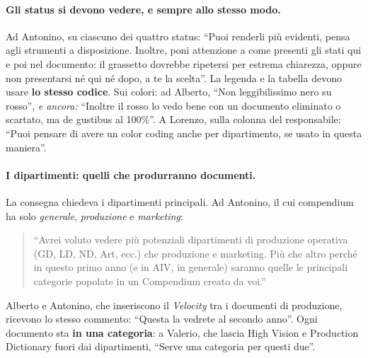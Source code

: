 \paragraph{Gli status si devono vedere, e sempre allo stesso modo.} Ad
Antonino, su ciascuno dei quattro status: ``Puoi renderli più evidenti, pensa
agli strumenti a disposizione. Inoltre, poni attenzione a come presenti gli
stati qui e poi nel documento: il grassetto dovrebbe ripetersi per estrema
chiarezza, oppure non presentarsi né qui né dopo, a te la scelta''. La
legenda e la tabella devono usare \textbf{lo stesso codice}. Sui colori: ad
Alberto, ``Non leggibilissimo nero su rosso'', \emph{e ancora:} ``Inoltre il
rosso lo vedo bene con un documento eliminato o scartato, ma de gustibus al
100\%''. A Lorenzo, sulla colonna del responsabile: ``Puoi pensare di avere
un color coding anche per dipartimento, se usato in questa maniera''.

\paragraph{I dipartimenti: quelli che produrranno documenti.} La consegna
chiedeva i dipartimenti principali. Ad Antonino, il cui compendium ha solo
\emph{generale}, \emph{produzione} e \emph{marketing}:
\begin{quote}
  ``Avrei voluto vedere più potenziali dipartimenti di produzione operativa
  (GD, LD, ND, Art, ecc.) che produzione e marketing. Più che altro perché in
  questo primo anno (e in AIV, in generale) saranno quelle le principali
  categorie popolate in un Compendium creato da voi.''
\end{quote}
Alberto e Antonino, che inseriscono il \emph{Velocity} tra i documenti
di produzione, ricevono lo stesso commento: ``Questa la vedrete al secondo anno''. Ogni
documento sta \textbf{in una categoria}: a Valerio, che lascia High Vision e
Production Dictionary fuori dai dipartimenti, ``Serve una categoria per
questi due''.

